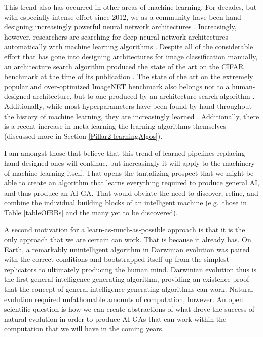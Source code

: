 \documentclass{article}
\begin{document}
This trend also has occurred in other areas of machine learning. For decades, but with especially intense effort since 2012, we as a community have been hand-designing increasingly powerful neural network architectures \cite{he2015deep,huang:arxiv16,szegedy:arxiv16,Goodfellow-et-al-2016}. Increasingly, however, researchers are searching for deep neural network architectures automatically with machine learning algorithms \cite{real:arxiv18,rawal:arxiv18,miikkulainen:arxiv17,zoph2016neural}. Despite all of the considerable effort that has gone into designing architectures for image classification manually, an architecture search algorithm produced the state of the art on the CIFAR benchmark at the time of its publication \cite{real2018regularized}. The state of the art on the extremely popular and over-optimized ImageNET benchmark also belongs not to a human-designed architecture, but to one produced by an architecture search algorithm \cite{real2018regularized}. Additionally, while most hyperparameters have been found by hand throughout the history of machine learning, they are increasingly learned \cite{snoek2012practical,jaderberg2017population}. Additionally, there is a recent increase in meta-learning the learning algorithms themselves \cite{duan2016rl,wang2016learning,ellefsen2015neural, velez2017diffusion,soltoggio2018born} (discussed more in Section \ref{Pillar2-learningAlgos}). 

I am amongst those that believe that this trend of learned pipelines replacing hand-designed ones will continue, but increasingly it will apply to the machinery of machine learning itself. That opens the tantalizing prospect that we might be able to create an algorithm that learns everything required to produce general AI, and thus produce an AI-GA. That would obviate the need to discover, refine, and combine the individual building blocks of an intelligent machine (e.g.\ those in Table \ref{tableOfBBs} and the many yet to be discovered). 

A second motivation for a learn-as-much-as-possible approach is that it is the only approach that we are certain can work. That is because it already has. On Earth, a remarkably unintelligent algorithm in Darwinian evolution was paired with the correct conditions and bootstrapped itself up from the simplest replicators to ultimately producing the human mind. Darwinian evolution thus is the first general-intelligence-generating algorithm, providing an existence proof that the concept of general-intelligence-generating algorithms can work. Natural evolution required unfathomable amounts of computation, however. An open scientific question is how we can create abstractions of what drove the success of natural evolution in order to produce AI-GAs that can work within the computation that we will have in the coming years. 
\end{document}
